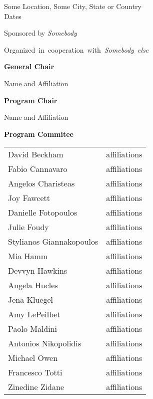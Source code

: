 \documentclass{llncs}
\begin{document}
\vspace{-\bigskipamount}
\vspace{-\bigskipamount}
\begin{center}
{\large Some Location, Some City, State or Country\\
Dates}

\bigskip\bigskip Sponsored by \emph{Somebody}

\medskip \mbox{Organized in cooperation with \emph{Somebody else}}

\bigskip\bigskip\textbf{\large General Chair}

 \smallskip
Name and Affiliation

\bigskip\bigskip\textbf{\large Program Chair}

\smallskip
Name and Affiliation


\bigskip\textbf{\large Program Commitee}

\smallskip\begin{tabular}{@{}p{4.2cm}@{}p{7.2cm}@{}}
David Beckham	& affiliations\\ 
Fabio Cannavaro	& affiliations\\ 
Angelos Charisteas	& affiliations\\ 
Joy Fawcett	& affiliations\\ 
Danielle Fotopoulos	& affiliations\\ 
Julie Foudy	& affiliations\\ 
Stylianos Giannakopoulos	& affiliations\\ 
Mia Hamm	& affiliations\\ 
Devvyn Hawkins	& affiliations\\ 
Angela Hucles	& affiliations\\ 
Jena Kluegel	& affiliations\\ 
Amy LePeilbet	& affiliations\\ 
Paolo Maldini	& affiliations\\ 
Antonios Nikopolidis	& affiliations\\ 
Michael Owen	& affiliations\\ 
Francesco Totti	& affiliations\\ 
Zinedine Zidane	& affiliations\\ 
\end{tabular}

%
\end{center}
\end{document}
